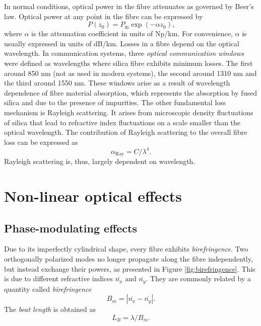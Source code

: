 \documentclass{standalone}
\begin{document}
In normal conditions, optical power in the fibre attenuates as governed by Beer's law. Optical power at any point in the fibre can be expressed by
\begin{equation}
P(z_0) = P_\textrm{in} \exp\left(-\alpha z_0\right) \textrm{,}
\end{equation}
where $\alpha$ is the attenuation coefficient in units of Np/km. For convenience, $\alpha$ is usually expressed in units of dB/km. Losses in a fibre depend on the optical wavelength. In communication systems, three \emph{optical communication windows} were defined as wavelengths where silica fibre exhibits minimum losses. The first around 850 nm (not as used in modern systems), the second around 1310 nm and the third around 1550 nm. These windows arise as a result of wavelength dependence of fibre material absorption, which represents the absorption by fused silica and due to the presence of impurities. The other fundamental loss mechanism is Rayleigh scattering. It arises from microscopic density fluctuations of silica that lead to refractive index fluctuations on a scale smaller than the optical wavelength. The contribution of Rayleigh scattering to the overall fibre loss can be expressed as
\begin{equation}
\alpha_\textrm{Ray} = C / \lambda^4 \textrm{.}
\end{equation}
Rayleigh scattering is, thus, largely dependent on wavelength. \\


\section{Non-linear optical effects}

\subsection{Phase-modulating effects}

Due to its imperfectly cylindrical shape, every fibre exhibits \textit{birefringence}. Two orthogonally polarized modes no longer propagate along the fibre independently, but instead exchange their powers, as presented in Figure \ref{fig:birefringence}.
This is due to different refractive indices $\bar{n_x}$ and $\bar{n_y}$. They are commonly related by a quantity called \textit{birefringence}
\begin{equation}
B_m = \left| \bar{n_x} - \bar{n_y} \right| \textrm{.}
\end{equation}
The \textit{beat length} is obtained as
\begin{equation}
L_B = \lambda / B_m \textrm{.}
\end{equation}
\end{document}
